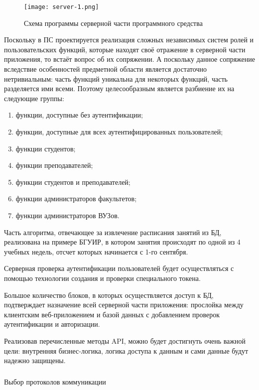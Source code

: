 \begin{sidewaysfigure}
\centering
	\texttt{[image: server-1.png]}
	\caption{Схема программы серверной части программного средства}
	\label{fig:design:server:interface:server_algorithm}
\end{sidewaysfigure}

Поскольку в ПС проектируется реализация сложных независимых систем ролей и пользовательских функций, которые находят своё отражение в серверной части приложения, то встаёт вопрос об их сопряжении. А поскольку данное сопряжение вследствие особенностей предметной области является достаточно нетривиальным: часть функций уникальна для некоторых функций, часть разделяется ими всеми. Поэтому целесообразным является разбиение их на следующие группы:

\begin{enumerate}
	\item функции, доступные без аутентификации;
	\item функции, доступные для всех аутентифицированных пользователей;
	\item функции студентов;
	\item функции преподавателей;
	\item функции студентов и преподавателей;
	\item функции администраторов факультетов;
	\item функции администраторов ВУЗов.
\end{enumerate}

Часть алгоритма, отвечающее за извлечение расписания занятий из БД, реализована на примере БГУИР, в котором занятия происходят по одной из 4 учебных недель, отсчет которых начинается с 1-го сентября.

Серверная проверка аутентификации пользователей будет осуществляться с помощью технологии создания и проверки специального токена.

Большое количество блоков, в которых осуществляется доступ к БД, подтверждает назначение всей серверной части приложения: прослойка между клиентским веб-приложением и базой данных с добавлением проверок аутентификации и авторизации.

Реализовав перечисленные методы API, можно будет достигнуть очень важной цели: внутренняя бизнес-логика, логика доступа к данным и сами данные будут надежно защищены.

\subsubsection{} Выбор протоколов коммуникации
\label{sec:design:server:protocols}

